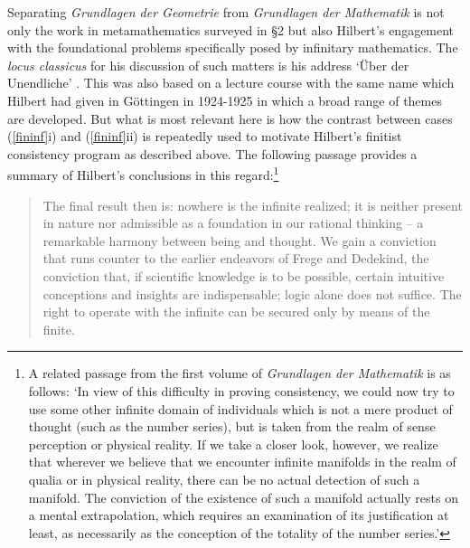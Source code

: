 \documentclass[11pt,fleqn,leqno]{article}
\begin{document}
Separating \textsl{Grundlagen der Geometrie} from \textsl{Grundlagen der Mathematik} is not only the work in metamathematics surveyed in \S 2 but also Hilbert's engagement with the foundational problems specifically posed by infinitary mathematics.    The \textsl{locus classicus} for his discussion of such matters is his address `\"Uber der Unendliche' \citeyearpar{Hilbert1925}.   This was also based on a lecture course with the same name which Hilbert had given in G\"ottingen in 1924-1925 in which a broad range of themes are developed.    But what is most relevant here is how the contrast between cases (\ref{fininf}i) and (\ref{fininf}ii) is repeatedly used to motivate Hilbert's finitist consistency program as described above.   The following passage provides a summary of Hilbert's conclusions in this regard:\footnote{A related passage from the first volume of \textsl{Grundlagen der Mathematik} \citeyearpar[pp. 15-16]{Hilbert1934} is as follows: `In view of this difficulty in proving consistency, we could now try to use some other infinite domain of individuals which is not a mere product of thought (such as the number series), but is taken from the realm of sense perception or physical reality. If we take a closer look, however, we realize that wherever we believe that we encounter infinite manifolds in the realm of qualia or in physical reality, there can be no actual detection of such a manifold. The conviction of the existence of such a manifold actually rests on a mental extrapolation, which requires an examination of its justification at least, as necessarily as the conception of the totality of the number series.'}
\begin{quote}
{\footnotesize The final result then is: nowhere is the infinite realized; it is neither present in nature nor admissible as a foundation in our rational thinking -- a remarkable harmony between being and thought. We gain a conviction that runs counter to the earlier endeavors of Frege and Dedekind, the conviction that, if scientific knowledge is to be possible, certain intuitive conceptions and insights are indispensable; logic alone does not suffice. The right to operate with the infinite can be secured only by means of the finite. \hspace*{1ex} \hfill \citeyearpar[p. 392]{Hilbert1925}} 
\end{quote}
\end{document}
